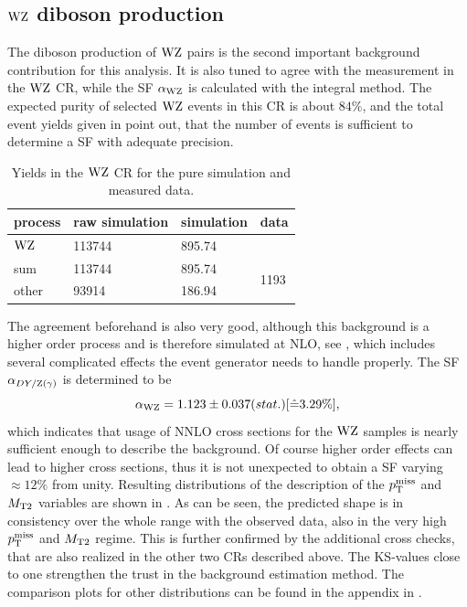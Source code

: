 \subsection{$\mathrm{W}\mathrm{Z}$ diboson production}
The diboson production of $\mathrm{W}\mathrm{Z}$ pairs is the second important background contribution for this analysis. It is also tuned to agree with the measurement in the $\mathrm{W}\mathrm{Z}$ CR, while the SF $\alpha_{\mathrm{W}\mathrm{Z}}$ is calculated with the integral method. The expected purity of selected $\mathrm{W}\mathrm{Z}$ events in this CR is about $84\%$, and the total event yields given in  point out, that the number of events is sufficient to determine a SF with adequate precision.
\begin{table}[tbp]
 \centering
 \caption{Yields in the $\mathrm{W}\mathrm{Z}$ CR for the pure simulation and measured data.}
 \label{tab:CRWZ}
 \begin{tabular}{llll}
  process  & raw simulation & simulation & data                  \\\hline
  $\mathrm{W}\mathrm{Z}$ & 113744         & 895.74     &                       \\\hline\hline
  sum      & 113744         & 895.74     & \multirow{2}{*}{1193} \\
  other    & 93914          & 186.94     &                       
 \end{tabular}
\end{table}
The agreement beforehand is also very good, although this background is a higher order process and is therefore simulated at NLO, see , which includes several complicated effects the event generator needs to handle properly. The SF $\alpha_{DY/\mathrm{Z}(\gamma)}$ is determined to be
\begin{equation}\label{eq:AlphaWZ}
 \alpha_{\mathrm{W}\mathrm{Z}}=1.123 \pm 0.037 (stat.) [\hat{=}3.29\%],
\end{equation}
which indicates that usage of NNLO cross sections for the $\mathrm{W}\mathrm{Z}$ samples is nearly sufficient enough to describe the background. Of course higher order effects can lead to higher cross sections, thus it is not unexpected to obtain a SF varying $\approx12\%$ from unity. Resulting distributions of the description of the $p_{\mathrm{T}}^\text{miss}$ and $M_{\mathrm{T2}}$ variables are shown in . As can be seen, the predicted shape is in consistency over the whole range with the observed data, also in the very high $p_{\mathrm{T}}^\text{miss}$ and $M_{\mathrm{T2}}$ regime. This is further confirmed by the additional cross checks, that are also realized in the other two CRs described above. The KS-values close to one strengthen the trust in the background estimation method. The comparison plots for other distributions can be found in the appendix in .
